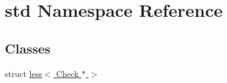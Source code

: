 \hypertarget{namespacestd}{\section{std Namespace Reference}
\label{namespacestd}
}
\subsection*{Classes}
\begin{DoxyCompactItemize}
\item 
struct \hyperlink{structstd_1_1less_3_01_check_01_5_01_4}{less$<$ Check $\ast$ $>$}
\end{DoxyCompactItemize}
